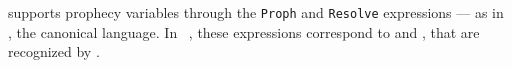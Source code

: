 \Zoo supports prophecy variables through the \texttt{Proph} and \texttt{Resolve} expressions --- as in \HeapLang, the canonical \Iris language.
In \OCaml~, these expressions correspond to  and , that are recognized by \ocamlToZoo.

